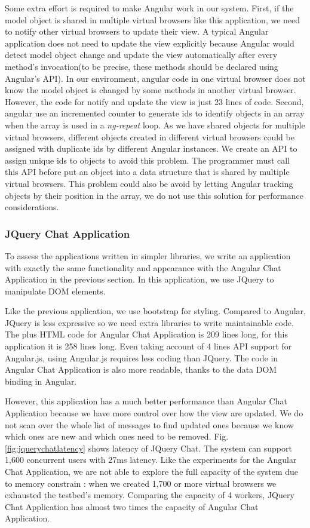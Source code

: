 Some extra effort is required to make Angular work in our system.
First, if the model object is shared in multiple virtual browsers like this application,
we need to notify other virtual browsers to update their view.
A typical Angular application does not need to update the view explicitly because
Angular would detect model object change and update the view automatically 
after every method's invocation(to be precise, these methods should be declared using Angular's API).
In our environment, angular code in one virtual browser does not know the model object
is changed by some methods in another virtual browser.
However, the code for notify and update the view is just 23 lines of code.
Second, angular use an incremented counter to generate ids to identify objects in an array when the 
array is used in a \emph{ng-repeat} loop.
As we have shared objects for multiple virtual browsers,
different objects created in different virtual browsers could be assigned with duplicate 
ids by different Angular instances.
We create an API to assign unique ids to objects to avoid this problem.
The programmer must call this API before put an object into a data structure that is shared
by multiple virtual browsers.
This problem could also be avoid by letting Angular tracking objects by their position in the array,
we do not use this solution for performance considerations.


\angularchatlatency{}

\subsubsection{JQuery Chat Application}
\label{sec:jquery}
To assess the applications written in simpler \js{} libraries,
we write an application with exactly the same functionality and 
appearance with the Angular Chat Application in the previous section.
In this application, we use JQuery to manipulate DOM elements.

Like the previous application, we use bootstrap for styling.
Compared to Angular, JQuery is less expressive so we need
extra libraries to write maintainable code.
The \js{} plus HTML code for Angular Chat Application is 209 lines long,
for this application it is 258 lines long.
Even taking account of 4 lines API support for Angular.js, 
using Angular.js requires less coding than JQuery.
The code in Angular Chat Application is also more readable,
thanks to the data DOM binding in Angular.

However, this application has a much better performance than Angular 
Chat Application because we have more control over how the view
are updated.
We do not scan over the whole list of messages to find updated ones
because we know which ones are new and which ones need to be removed.
Fig.\ref{fig:jquerychatlatency} shows latency of JQuery Chat.
The system can support 1,600 concurrent users with 27ms latency.
Like the experiments for the Angular Chat Application,
we are not able to explore the full capacity of the system due to 
memory constrain :
when we created 1,700 or more virtual browsers we exhausted the testbed's memory.
Comparing the capacity of 4 workers, 
JQuery Chat Application has almost two times the capacity of Angular Chat Application.


